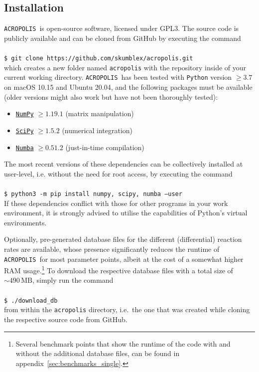 \documentclass[11pt,a4paper]{article}
\newcommand{\cmd}[1]{\vspace{0.3cm}\texttt{\$ #1}\\[0.3cm]}
\newcommand{\acropolis}{\texttt{ACROPOLIS}~}
\begin{document}
\subsection{Installation}
\acropolis is open-source software, licensed under GPL3. The source code is publicly available and can be cloned from GitHub by executing the command\\\\
\cmd{git clone https://github.com/skumblex/acropolis.git}
which creates a new folder named \texttt{acropolis} with the repository inside of your current working directory.
\acropolis has been tested with \texttt{Python} version $\geq 3.7$ on macOS 10.15 and Ubuntu 20.04, and the following packages must be available (older versions might also work but have not been thoroughly tested):
\begin{itemize}
	\item \href{https://numpy.org/}{\texttt{NumPy}} $\geq 1.19.1$ (matrix manipulation)
	\item \href{https://www.scipy.org/}{\texttt{SciPy}} $\geq 1.5.2$ (numerical integration)
	\item \href{https://numba.pydata.org/}{\texttt{Numba}} $\geq 0.51.2$ (just-in-time compilation)
\end{itemize}
The most recent versions of these dependencies can be collectively installed at user-level, i.e. without the need for root access, by executing the command\\\\
\cmd{python3 -m pip install numpy, scipy, numba --user}
If these dependencies conflict with those for other programs in your work environment, it is strongly advised to utilise the capabilities of Python's virtual environments.

Optionally, pre-generated database files for the different (differential) reaction rates are available, whose presence significantly reduces the runtime of \acropolis for most parameter points, albeit at the cost of a somewhat higher RAM usage.\footnote{Several benchmark points that show the runtime of the code with and without the additional database files, can be found in appendix~\ref{sec:benchmarks_single}.} To download the respective database files with a total size of $\sim 490 \, \mathrm{MB}$, simply run the command\\\\
\cmd{./download\_db}
from within the \texttt{acropolis} directory, i.e.\ the one that was created while cloning the respective source code from GitHub.
\end{document}
